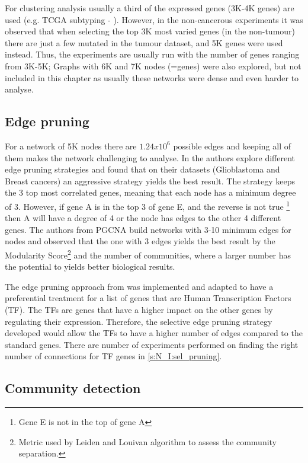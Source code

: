 For clustering analysis usually a third of the expressed genes (3K-4K genes) are used (e.g. TCGA subtyping - \citet{Robertson2017-mg}). However, in the non-cancerous experiments it was observed that when selecting the top 3K most varied genes (in the non-tumour) there are just a few mutated in the tumour dataset, and 5K genes were used instead. Thus, the experiments are usually run with the number of genes ranging from 3K-5K; Graphs with 6K and 7K nodes (=genes) were also explored, but not included in this chapter as usually these networks were dense and even harder to analyse.

\subsection{Edge pruning}
For a network of 5K nodes there are $1.24x10^6$ possible edges and keeping all of them makes the network challenging to analyse. In \citet{Care2019-ij} the authors explore different edge pruning strategies and found that on their datasets (Glioblastoma and Breast cancers) an aggressive strategy yields the best result. The strategy keeps the 3 top most correlated genes, meaning that each node has a minimum degree of 3. However, if gene A is in the top 3 of gene E, and the reverse is not true \footnote{Gene E is not in the top of gene A} then A will have a degree of 4 or the node has edges to the other 4 different genes. The authors from PGCNA build networks with 3-10 minimum edges for nodes and observed that the one with 3 edges yields the best result by the Modularity Score\footnote{Metric used by Leiden and Louivan algorithm to assess the community separation.} and the number of communities, where a larger number has the potential to yields better biological results.

The edge pruning approach from \citet{Care2019-ij} was implemented and adapted to have a preferential treatment for a list of genes that are Human Transcription Factors \cite{Lambert2018-el} (TF). The TFs are genes that have a higher impact on the other genes by regulating their expression. Therefore, the selective edge pruning strategy developed would allow the TFs to have a higher number of edges compared to the standard genes. There are number of experiments performed on finding the right number of connections for TF genes in \cref{s:N_I:sel_pruning}.

\subsection{Community detection}


